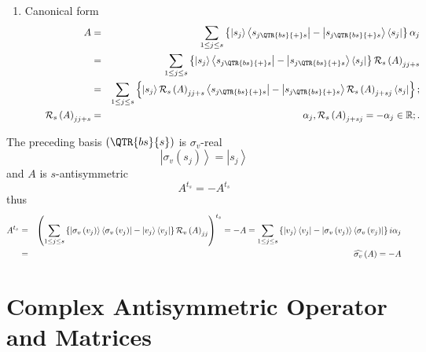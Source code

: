 \begin{remark}
\begin{enumerate}
\item Canonical form 
\begin{eqnarray}
A &=&\sum_{1\leq j\leq s}\left\{ \left\vert s_{j}\right\rangle \left\langle
s_{j\QTR{bs}{+}s}\right\vert -\left\vert s_{j\QTR{bs}{+}s}\right\rangle
\left\langle s_{j}\right\vert \right\} \alpha _{j} \\
&=&\sum_{1\leq j\leq s}\left\{ \left\vert s_{j}\right\rangle \left\langle
s_{j\QTR{bs}{+}s}\right\vert -\left\vert s_{j\QTR{bs}{+}s}\right\rangle
\left\langle s_{j}\right\vert \right\} {\cal R}_{s}\left( A\right) _{jj+s} \\
&=&\sum_{1\leq j\leq s}\left\{ \left\vert s_{j}\right\rangle {\cal R}%
_{s}\left( A\right) _{jj+s}\left\langle s_{j\QTR{bs}{+}s}\right\vert
-\left\vert s_{j\QTR{bs}{+}s}\right\rangle {\cal R}_{s}\left( A\right)
_{j+sj}\left\langle s_{j}\right\vert \right\} ; \\
\qquad {\cal R}_{s}\left( A\right) _{jj+s} &=&\alpha _{j},{\cal R}_{s}\left(
A\right) _{j+sj}=-\alpha _{j}\in {\Bbb R};.
\end{eqnarray}
\end{enumerate}
\end{remark}

\begin{remark}
The preceding basis $\left( \QTR{bs}{s}\right) $ is $\sigma _{v}$-real 
\begin{equation}
\left\vert \sigma _{v}\left( s_{j}\right) \right\rangle =\left\vert
s_{j}\right\rangle
\end{equation}%
and $A$ is $s$-antisymmetric 
\begin{equation}
A^{t_{s}}=-A^{t_{s}}
\end{equation}%
thus 
\begin{eqnarray}
A^{t_{s}} &=&\left( \sum_{1\leq j\leq s}\left\{ \left\vert \sigma _{v}\left(
v_{j}\right) \right\rangle \left\langle \sigma _{v}\left( v_{j}\right)
\right\vert -\left\vert v_{j}\right\rangle \left\langle v_{j}\right\vert
\right\} {\cal R}_{v}\left( A\right) _{jj}\right) ^{t_{s}}=-A=\sum_{1\leq
j\leq s}\left\{ \left\vert v_{j}\right\rangle \left\langle v_{j}\right\vert
-\left\vert \sigma _{v}\left( v_{j}\right) \right\rangle \left\langle \sigma
_{v}\left( v_{j}\right) \right\vert \right\} i\alpha _{j} \\
&=&\widehat{\sigma _{v}}\left( A\right) =-A
\end{eqnarray}
\end{remark}

\section{Complex Antisymmetric Operator and Matrices}

